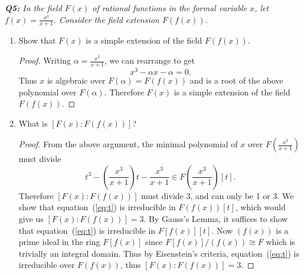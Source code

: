 \documentclass{article}
\begin{document}
\it \textbf{Q5:} In the field $F(x)$ of rational functions in the formal
  variable $x$, let $f(x)=\frac{x^3}{x+1}$. Consider the field extension
  $F(f(x))$.

  \begin{enumerate}[label={(\alph*)}]
    \item Show that $F(x)$ is a simple extension of the field $F(f(x))$.
      \begin{proof}
        Writing $\alpha=\frac{x^3}{x+1}$, we can rearrange to get
        \begin{equation}
          x^3-\alpha x-\alpha=0.
          \label{eq:x}
        \end{equation}
        Thus $x$ is algebraic over $F(\alpha)=F(f(x))$ and is a root of the
        above polynomial over $F(\alpha)$. Therefore $F(x)$ is a simple
        extension of the field $F(f(x))$.
      \end{proof}

    \item What is $[F(x):F(f(x))]$?
      \begin{proof}
        From the above argument, the minimal polynomial of $x$ over
        $F\left(\frac{x^3}{x+1} \right)$ must divide
        \begin{equation}
          t^3 -\left(\frac{x^3}{x+1} \right)t
          -\frac{x^3}{x+1}\in F\left(\frac{x^3}{x+1} \right)[t].
          \label{eq:t}
        \end{equation}
        Therefore $[F(x):F(f(x))]$ must divide 3, and can only be 1 or 3.
        We show that equation~(\ref{eq:t}) is irreducible in $F(f(x))[t]$,
        which would give us $[F(x):F(f(x))]=3$. By Gauss's Lemma, it
        suffices to show that equation~(\ref{eq:t}) is irreducible in
        $F[f(x)][t]$. Now $(f(x))$ is a prime ideal in the ring $F[f(x)]$
        since $F[f(x)]/(f(x))\cong F$ which is trivially an integral
        domain. Thus by Eisenstein's criteria, equation~(\ref{eq:t}) is
        irreducible over $F(f(x))$, thus $[F(x):F(f(x))]=3$.



\end{proof}
\end{enumerate}
\end{document}
